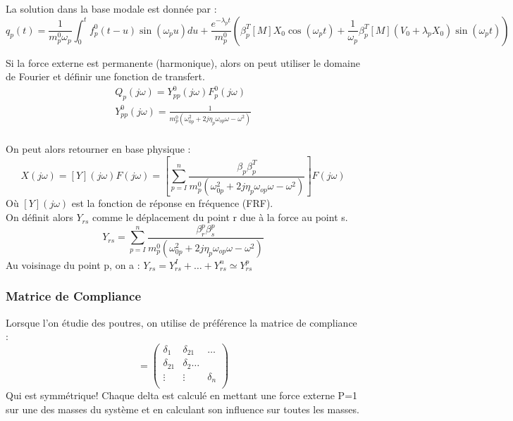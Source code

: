 \documentclass[../main.tex]{subfiles}
\begin{document}
La solution dans la base modale est donnée par : \begin{equation}
    q_p(t) = \frac{1}{m_p^0 \omega_p} \int_0^t f_p^0 (t-u)\sin(\omega_p u)du + \frac{e^{-\lambda_p t}}{m_p^0} (\beta_p^T [M] X_0 \cos(\omega_p t) + \frac{1}{\omega_p} \beta_p^T [M] (V_0+\lambda_p X_0)\sin(\omega_p t))
\end{equation}

Si la force externe est permanente (harmonique), alors on peut utiliser le domaine de Fourier et définir une fonction de transfert.\\
\begin{equation}
    \begin{gathered}
        Q_p(j\omega) = Y_{pp}^0(j\omega) F_p^0(j\omega)\\
        Y_{pp}^0 (j\omega) = \frac{1}{m_p^0(\omega_{0p}^2 + 2j\eta_p \omega_{op}\omega - \omega^2)}\\
    \end{gathered}
\end{equation}

On peut alors retourner en base physique : \begin{equation}
    X(j\omega) = [Y](j\omega) F(j\omega) =[ \sum_{p=I}^n \frac{\beta_p \beta^T_p}{m_p^0(\omega_{0p}^2 + 2j\eta_p \omega_{op}\omega - \omega^2)}]F(j\omega)
\end{equation}
Où $[Y](j\omega)$ est la fonction de réponse en fréquence (FRF).\\
On définit alors $Y_{rs}$ comme le déplacement du point r due à la force au point s.\\
\begin{equation}
    Y_{rs} = \sum_{p=I}^n \frac{\beta_r^p \beta_s^p}{m_p^0(\omega_{0p}^2 + 2j\eta_p \omega_{op}\omega - \omega^2)}
\end{equation}
Au voisinage du point p, on a : $Y_{rs} = Y_{rs}^I + \dots + Y_{rs}^n \simeq Y_{rs}^p$\\

\subsubsection{Matrice de Compliance}
Lorsque l'on étudie des poutres, on utilise de préférence la matrice de compliance : \begin{equation}
    [\alpha] = \begin{pmatrix}
        \delta_1 & \delta_{21} & \dots\\
        \delta_{21} & \delta_2 \dots\\
        \vdots & \vdots & \delta_n\\
    \end{pmatrix}
\end{equation}
Qui est symmétrique! Chaque delta est calculé en mettant une force externe P=1 sur une des masses du système et en calculant son influence sur toutes les masses.\\
\end{document}
